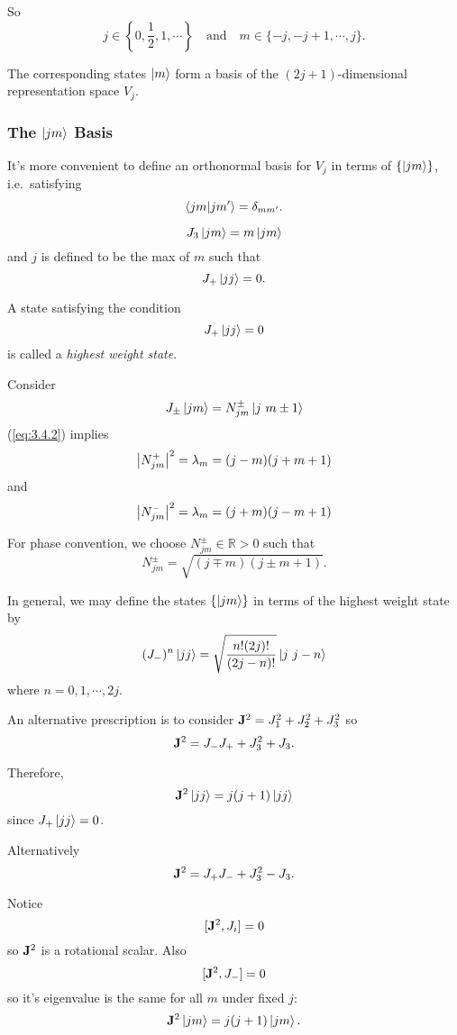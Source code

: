 \documentclass[a4paper,11pt]{article}
\begin{document}
	So
	\[
		j \in \left\{0, \frac{1}{2}, 1, \cdots\right\} \quad \text{and} \quad m \in \{-j, -j+1, \cdots, j\}.
	\]
	
	The corresponding states $\ket{m}$ form a basis of the $(2j+1)$-dimensional representation space $V_j$.

	\subsubsection{The $\ket{jm}$ Basis}

	It's more convenient to define an orthonormal basis for $V_j$ in terms of $\{\ket{jm}\}$, i.e.\ satisfying
	\begin{equation}
		\braket{jm}{jm'} = \delta _{mm'}.
		\label{eq:3.4.2}
	\end{equation}

	\[
		J_3 \ket{jm} = m \ket{jm}
	\]
	and $j$ is defined to be the max of $m$ such that
	\[
		J_+ \ket{jj}=0.
	\]
	
	\begin{defi}
		A state satisfying the condition
		\[
		J_+ \ket{jj}=0
		\]
		is called a \emph{highest weight state}.
	\end{defi}

	Consider
	\[
		J _{\pm} \ket{jm} = N _{jm}^\pm \ket{j\ m\pm 1}
	\]
	(\ref{eq:3.4.2}) implies
	\[
		\abs{N _{jm}^+}^2 = \lambda_m = (j-m)(j + m + 1)
	\]
	and
	\[
		\abs{N _{jm}^-}^2 = \lambda_m = (j+m)(j - m + 1)
	\]

	For phase convention, we choose $N _{jm}^\pm \in \mathbb{R} > 0$ such that
	\[
		N _{jm}^\pm = \sqrt{(j \mp m)(j \pm m + 1)}.
	\]
	
	In general, we may define the states $\{\ket{jm}\}$ in terms of the highest weight state by
	\[
		(J_-)^n \ket{jj} = \sqrt{\frac{n! (2j)!}{(2j-n)!}} \ket{j\ j-n}
	\]
	where $n = 0,1,\cdots,2j$.

	An alternative prescription is to consider $\vb J^2 = J_1^2 + J_2^2 + J_3^2$ so
	\[
		\vb J^2 = J_- J_+ + J_3^2 + J_3.
	\]
	
	Therefore,
	\[
		\vb J^2 \ket{jj} = j(j+1)\ket{jj}
	\]
	since $J_+ \ket{jj}=0$.
	
	\begin{nt}
		Alternatively
		\[
			\vb J^2 = J_+ J_- + J_3^2 - J_3.
		\]
	\end{nt}

	Notice
	\[
		[\vb J^2 , J_i]=0
	\]
	so $\vb J^2$ is a rotational scalar. Also
	\[
		[\vb J^2, J_-]=0
	\]
	so it's eigenvalue is the same for all $m$ under fixed $j$:
	\[
		\vb J^2 \ket{jm} = j(j+1)\ket{jm}.
	\]
	
\end{document}
